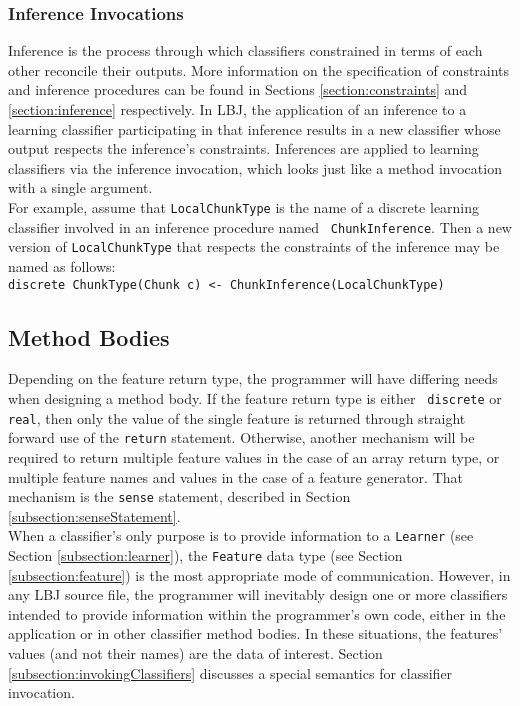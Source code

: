 \subsubsection{Inference Invocations}
\label{subsubsection:inferenceInvocations}
Inference is the process through which classifiers constrained in terms of
each other reconcile their outputs.  More information on the specification of
constraints and inference procedures can be found in Sections
\ref{section:constraints} and \ref{section:inference} respectively.  In LBJ,
the application of an inference to a learning classifier participating in that
inference results in a new classifier whose output respects the inference's
constraints.  Inferences are applied to learning classifiers via the inference
invocation, which looks just like a method invocation with a single argument.
\\

For example, assume that {\tt LocalChunkType} is the name of a discrete
learning classifier involved in an inference procedure named {\tt
ChunkInference}.  Then a new version of {\tt LocalChunkType} that respects the
constraints of the inference may be named as follows: \\

\vspace{-.25cm}
{\tt discrete ChunkType(Chunk c) <- ChunkInference(LocalChunkType)}

\subsection{Method Bodies} \label{section:methodBodies}

Depending on the feature return type, the programmer will have differing needs
when designing a method body.  If the feature return type is either {\tt
discrete} or {\tt real}, then only the value of the single feature is returned
through straight forward use of the {\tt return} statement.  Otherwise,
another mechanism will be required to return multiple feature values in the
case of an array return type, or multiple feature names and values in the case
of a feature generator.  That mechanism is the {\tt sense} statement,
described in Section \ref{subsection:senseStatement}. \\

When a classifier's only purpose is to provide information to a {\tt Learner}
(see Section \ref{subsection:learner}), the {\tt Feature} data type (see
Section \ref{subsection:feature}) is the most appropriate mode of
communication.  However, in any LBJ source file, the programmer will
inevitably design one or more classifiers intended to provide information
within the programmer's own code, either in the application or in other
classifier method bodies.  In these situations, the features' values (and not
their names) are the data of interest.  Section
\ref{subsection:invokingClassifiers} discusses a special semantics for
classifier invocation.

